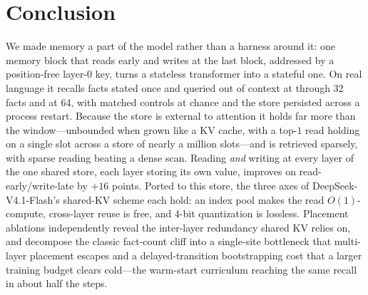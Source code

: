 \section{Conclusion}
\label{sec:conclusion}

We made memory a part of the model rather than a harness around it: one memory
block that reads early and writes at the last block, addressed by a position-free
layer-0 key, turns a stateless transformer into a stateful one. On real language it
recalls facts stated once and queried out of context at  through 32
facts and  at 64, with matched controls at chance and the store
persisted across a process restart. Because the store is external to attention it
holds far more than the window---unbounded when grown like a KV cache, with a top-$1$
read holding  on a single slot across a store of nearly a million slots---and
is retrieved sparsely, with sparse reading beating a dense scan. Reading \emph{and} writing at every layer of the one shared store, each layer
storing its own value, improves on read-early/write-late by $+16$ points. Ported
to this store, the three axes of DeepSeek-V4.1-Flash's shared-KV scheme each hold:
an index pool makes the read $O(1)$-compute, cross-layer reuse is free, and 4-bit
quantization is lossless. Placement ablations independently reveal the inter-layer
redundancy shared KV relies on, and decompose the classic fact-count cliff into a
single-site bottleneck that multi-layer placement escapes and a delayed-transition
bootstrapping cost that a larger training budget clears cold---the warm-start
curriculum reaching the same recall in about half the steps.

